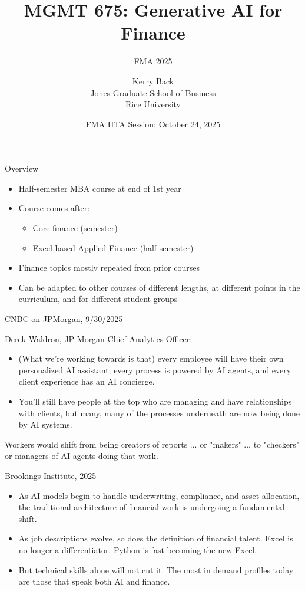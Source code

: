 \documentclass[aspectratio=169]{beamer}
\title{MGMT 675: Generative AI for Finance}
\subtitle{FMA 2025}
\date{FMA IITA Session: October 24, 2025}
\author{Kerry Back\\
Jones Graduate School of Business\\
Rice University}
\begin{document}
\initclock

\maketitle


\begin{frame}{Overview}
    \begin{itemize}
    \item Half-semester MBA course at end of 1st year
    \item Course comes after: 
    \begin{itemize}
    \item Core finance (semester) 
    \item Excel-based Applied Finance (half-semester)
    \end{itemize}
    \item Finance topics mostly repeated from prior courses
    \item Can be adapted to other courses of different lengths, at different points in the curriculum, and for different student groups
    \end{itemize}

\end{frame}


\begin{frame}{CNBC on JPMorgan, 9/30/2025}

Derek Waldron, JP Morgan Chief Analytics Officer:
\begin{itemize}
\item (What we're working towards is that) every employee will have their own personalized AI assistant; every process is powered by AI agents, and every client experience has an AI concierge.
\item You'll still have people at the top who are managing and have relationships with clients, but many, many of the processes underneath are now being done by AI systems.
\end{itemize}


Workers would shift from being creators of reports ... or "makers" ... to "checkers" or managers of AI agents doing that work.

\end{frame}

\begin{frame}{Brookings Institute, 2025}

\begin{itemize}
\item As AI models begin to handle underwriting, compliance, and asset allocation, the traditional architecture of financial work is undergoing a fundamental shift.
\item As job descriptions evolve, so does the definition of financial talent. Excel is no longer a differentiator. Python is fast becoming the new Excel. 
\item But technical skills alone will not cut it. The \alert{most in demand profiles today are those that speak both AI and finance}.
\end{itemize}
\end{frame}
\end{document}
